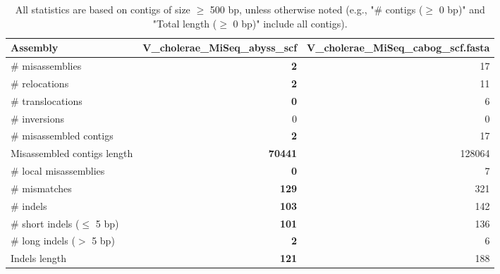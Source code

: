 \documentclass[12pt,a4paper]{article}
\begin{document}
\begin{table}[ht]
\begin{center}
\caption{All statistics are based on contigs of size $\geq$ 500 bp, unless otherwise noted (e.g., "\# contigs ($\geq$ 0 bp)" and "Total length ($\geq$ 0 bp)" include all contigs).}
\begin{tabular}{|l*{2}{|r}|}
\hline
Assembly & V\_cholerae\_MiSeq\_abyss\_scf & V\_cholerae\_MiSeq\_cabog\_scf.fasta \\ \hline
\# misassemblies & {\bf 2} & 17 \\ \hline
\hspace{5mm}\# relocations & {\bf 2} & 11 \\ \hline
\hspace{5mm}\# translocations & {\bf 0} & 6 \\ \hline
\hspace{5mm}\# inversions & 0 & 0 \\ \hline
\# misassembled contigs & {\bf 2} & 17 \\ \hline
Misassembled contigs length & {\bf 70441} & 128064 \\ \hline
\# local misassemblies & {\bf 0} & 7 \\ \hline
\# mismatches & {\bf 129} & 321 \\ \hline
\# indels & {\bf 103} & 142 \\ \hline
\hspace{5mm}\# short indels ($\leq$ 5 bp) & {\bf 101} & 136 \\ \hline
\hspace{5mm}\# long indels ($>$ 5 bp) & {\bf 2} & 6 \\ \hline
Indels length & {\bf 121} & 188 \\ \hline
\end{tabular}
\end{center}
\end{table}
\end{document}
